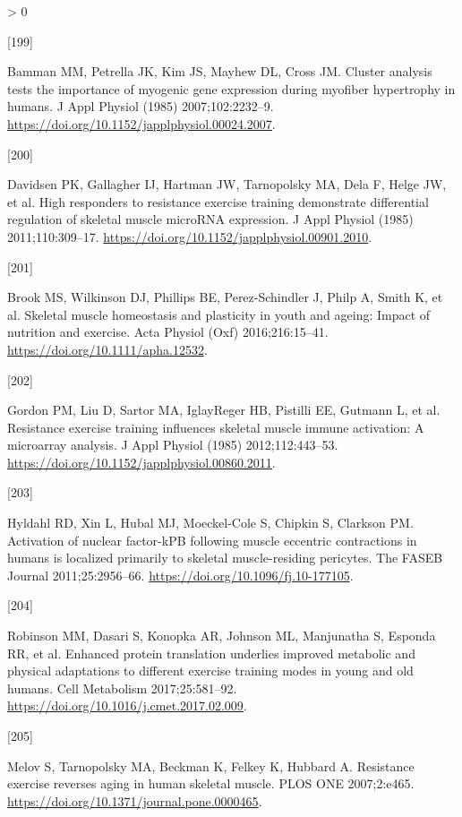 \documentclass[twoside,10pt]{gihclass} %
\newlength{\cslhangindent}
\newlength{\csllabelwidth}
\newenvironment{CSLReferences}[3] %
 {%
  \setlength{\parindent}{0pt}
  \ifodd #1 \everypar{\setlength{\hangindent}{\cslhangindent}}\ignorespaces\fi
  \ifnum #2 > 0
  \setlength{\parskip}{#2\baselineskip}
  \fi
 }%
 {}
\newcommand{\CSLLeftMargin}[1]{\parbox[t]{\maxof{\widthof{#1}}{\csllabelwidth}}{#1}}
\newcommand{\CSLRightInline}[1]{\parbox[t]{\linewidth}{#1}}
\begin{document}
\begin{CSLReferences}{0}{0}
\leavevmode\hypertarget{ref-RN765}{}%
\CSLLeftMargin{{[}199{]} }
\CSLRightInline{Bamman MM, Petrella JK, Kim JS, Mayhew DL, Cross JM. Cluster analysis tests the importance of myogenic gene expression during myofiber hypertrophy in humans. J Appl Physiol (1985) 2007;102:2232--9. \url{https://doi.org/10.1152/japplphysiol.00024.2007}.}

\leavevmode\hypertarget{ref-RN755}{}%
\CSLLeftMargin{{[}200{]} }
\CSLRightInline{Davidsen PK, Gallagher IJ, Hartman JW, Tarnopolsky MA, Dela F, Helge JW, et al. High responders to resistance exercise training demonstrate differential regulation of skeletal muscle microRNA expression. J Appl Physiol (1985) 2011;110:309--17. \url{https://doi.org/10.1152/japplphysiol.00901.2010}.}

\leavevmode\hypertarget{ref-RN1966}{}%
\CSLLeftMargin{{[}201{]} }
\CSLRightInline{Brook MS, Wilkinson DJ, Phillips BE, Perez-Schindler J, Philp A, Smith K, et al. Skeletal muscle homeostasis and plasticity in youth and ageing: Impact of nutrition and exercise. Acta Physiol (Oxf) 2016;216:15--41. \url{https://doi.org/10.1111/apha.12532}.}

\leavevmode\hypertarget{ref-RN1825}{}%
\CSLLeftMargin{{[}202{]} }
\CSLRightInline{Gordon PM, Liu D, Sartor MA, IglayReger HB, Pistilli EE, Gutmann L, et al. Resistance exercise training influences skeletal muscle immune activation: A microarray analysis. J Appl Physiol (1985) 2012;112:443--53. \url{https://doi.org/10.1152/japplphysiol.00860.2011}.}

\leavevmode\hypertarget{ref-RN2408}{}%
\CSLLeftMargin{{[}203{]} }
\CSLRightInline{Hyldahl RD, Xin L, Hubal MJ, Moeckel-Cole S, Chipkin S, Clarkson PM. Activation of nuclear factor-kPB following muscle eccentric contractions in humans is localized primarily to skeletal muscle-residing pericytes. The FASEB Journal 2011;25:2956--66. \url{https://doi.org/10.1096/fj.10-177105}.}

\leavevmode\hypertarget{ref-RN2400}{}%
\CSLLeftMargin{{[}204{]} }
\CSLRightInline{Robinson MM, Dasari S, Konopka AR, Johnson ML, Manjunatha S, Esponda RR, et al. Enhanced protein translation underlies improved metabolic and physical adaptations to different exercise training modes in young and old humans. Cell Metabolism 2017;25:581--92. \url{https://doi.org/10.1016/j.cmet.2017.02.009}.}

\leavevmode\hypertarget{ref-RN2397}{}%
\CSLLeftMargin{{[}205{]} }
\CSLRightInline{Melov S, Tarnopolsky MA, Beckman K, Felkey K, Hubbard A. Resistance exercise reverses aging in human skeletal muscle. PLOS ONE 2007;2:e465. \url{https://doi.org/10.1371/journal.pone.0000465}.}


\end{CSLReferences}
\end{document}
